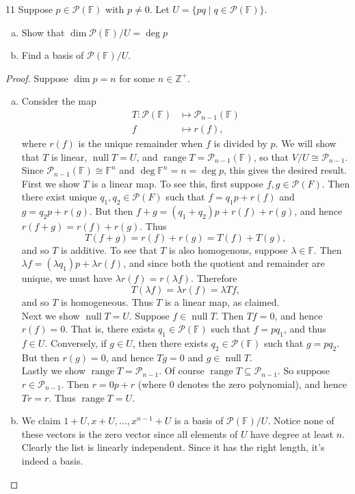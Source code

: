 \documentclass[11pt]{extarticle}
\newenvironment{problem}[1]{\begin{prob*}{#1}{}}{\end{prob*}}
\newcommand{\Z}{\mathbb{Z}}
\newcommand{\F}{\mathbb{F}}
\newcommand{\poly}{\mathcal{P}}
\DeclareMathOperator{\Null}{null}
\DeclareMathOperator{\Range}{range}
\begin{document}
\begin{problem}{11}
Suppose $p\in\poly(\F)$ with $p\neq 0$.  Let $U=\{pq\mid q\in\poly(\F)\}$.
\begin{enumerate}[(a)]
\item Show that $\dim\poly(\F)/U = \deg p$
\item Find a basis of $\poly(\F)/U$.
\end{enumerate}
\end{problem}
\begin{proof}
Suppose $\dim p=n$ for some $n\in\Z^+$.
\begin{enumerate}[(a)]
\item Consider the map
\begin{align*}
T:\poly(\F) &\mapsto \poly_{n-1}(\F)\\
f &\mapsto r(f),
\end{align*}
where $r(f)$ is the unique remainder when $f$ is divided by $p$.  We will show that $T$ is linear, $\Null T = U$, and $\Range T = \poly_{n - 1}(\F)$, so that $V/U\cong \poly_{n - 1}$.  Since $\poly_{n-1}(\F)\cong \F^n$ and $\deg\F^n = n = \deg p$, this gives the desired result.
\indent First we show $T$ is a linear map.  To see this, first suppose $f,g\in\poly(F)$.  Then there exist unique $q_1,q_2\in\poly(F)$ such that $f = q_1p + r(f)$ and $g = q_2p + r(g)$.  But then $f + g = (q_1 + q_2)p + r(f) + r(g)$, and hence $r(f+g) = r(f)+r(g)$.  Thus
\begin{equation*}
T(f + g) = r(f) + r(g) = T(f) + T(g),
\end{equation*}
and so $T$ is additive.  To see that $T$ is also homogenous, suppose $\lambda\in\F$.  Then $\lambda f = (\lambda q_1)p + \lambda r(f)$, and since both the quotient and remainder are unique, we must have $\lambda r(f) = r(\lambda f)$.  Therefore
\begin{equation*}
T(\lambda f) = \lambda r(f) = \lambda Tf,
\end{equation*}
and so $T$ is homogeneous.  Thus $T$ is a linear map, as claimed.\\
\indent Next we show $\Null T= U$.  Suppose $f\in \Null T$.  Then $Tf = 0$, and hence $r(f) = 0$.  That is, there exists $q_1\in \poly(\F)$ such that $f = pq_1$, and thus $f\in U$.  Conversely, if $g\in U$, then there exists $q_2\in\poly(\F)$ such that $g = pq_2$.  But then $r(g)=0$, and hence $Tg =0$ and $g\in\Null T$.\\
\indent Lastly we show $\Range T = \poly_{n-1}$.  Of course $\Range T\subseteq \poly_{n-1}$.  So suppose $r \in \poly_{n-1}$.  Then $r = 0p + r$ (where $0$ denotes the zero polynomial), and hence $Tr = r$.  Thus $\Range T = U$.
\item We claim $1+U, x+U,\dots, x^{n-1}+U$ is a basis of $\poly(\F)/U$.  Notice none of these vectors is the zero vector since all elements of $U$ have degree at least $n$.  Clearly the list is linearly independent.  Since it has the right length, it's indeed a basis.  
\end{enumerate}
\end{proof}
\end{document}
